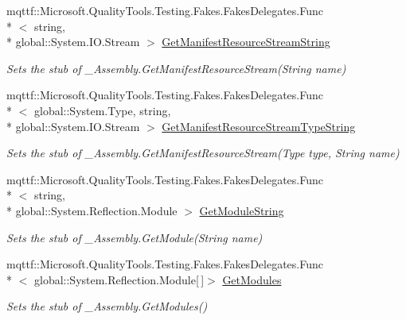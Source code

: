 \begin{DoxyCompactItemize}
mqttf\-::\-Microsoft.\-Quality\-Tools.\-Testing.\-Fakes.\-Fakes\-Delegates.\-Func\\*
$<$ string, \\*
global\-::\-System.\-I\-O.\-Stream $>$ \hyperlink{class_system_1_1_runtime_1_1_interop_services_1_1_fakes_1_1_stub___assembly_a499c1a246aff594f6a3874d64cef2e42}{Get\-Manifest\-Resource\-Stream\-String}
\begin{DoxyCompactList}\small\item\em Sets the stub of \-\_\-\-Assembly.\-Get\-Manifest\-Resource\-Stream(\-String name)\end{DoxyCompactList}\item 
mqttf\-::\-Microsoft.\-Quality\-Tools.\-Testing.\-Fakes.\-Fakes\-Delegates.\-Func\\*
$<$ global\-::\-System.\-Type, string, \\*
global\-::\-System.\-I\-O.\-Stream $>$ \hyperlink{class_system_1_1_runtime_1_1_interop_services_1_1_fakes_1_1_stub___assembly_a9f157428f7ad695d092f7da0a9107401}{Get\-Manifest\-Resource\-Stream\-Type\-String}
\begin{DoxyCompactList}\small\item\em Sets the stub of \-\_\-\-Assembly.\-Get\-Manifest\-Resource\-Stream(\-Type type, String name)\end{DoxyCompactList}\item 
mqttf\-::\-Microsoft.\-Quality\-Tools.\-Testing.\-Fakes.\-Fakes\-Delegates.\-Func\\*
$<$ string, \\*
global\-::\-System.\-Reflection.\-Module $>$ \hyperlink{class_system_1_1_runtime_1_1_interop_services_1_1_fakes_1_1_stub___assembly_a3ca816fbe3bd104ffb34d2e4a74aff5b}{Get\-Module\-String}
\begin{DoxyCompactList}\small\item\em Sets the stub of \-\_\-\-Assembly.\-Get\-Module(\-String name)\end{DoxyCompactList}\item 
mqttf\-::\-Microsoft.\-Quality\-Tools.\-Testing.\-Fakes.\-Fakes\-Delegates.\-Func\\*
$<$ global\-::\-System.\-Reflection.\-Module\mbox{[}$\,$\mbox{]}$>$ \hyperlink{class_system_1_1_runtime_1_1_interop_services_1_1_fakes_1_1_stub___assembly_a915884e5a2839e7832e07885bf8920a0}{Get\-Modules}
\begin{DoxyCompactList}\small\item\em Sets the stub of \-\_\-\-Assembly.\-Get\-Modules()\end{DoxyCompactList}\item 

\end{DoxyCompactItemize}
